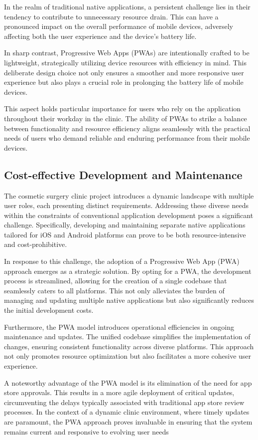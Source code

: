 \documentclass[conference]{IEEEtran}
\begin{document}
In the realm of traditional native applications, a persistent challenge lies in their tendency to contribute to unnecessary resource drain. This can have a pronounced impact on the overall performance of mobile devices, adversely affecting both the user experience and the device's battery life.

In sharp contrast, Progressive Web Apps (PWAs) are intentionally crafted to be lightweight, strategically utilizing device resources with efficiency in mind. This deliberate design choice not only ensures a smoother and more responsive user experience but also plays a crucial role in prolonging the battery life of mobile devices.

This aspect holds particular importance for users who rely on the application throughout their workday in the clinic. The ability of PWAs to strike a balance between functionality and resource efficiency aligns seamlessly with the practical needs of users who demand reliable and enduring performance from their mobile devices.

\subsection{Cost-effective Development and Maintenance}
The cosmetic surgery clinic project introduces a dynamic landscape with multiple user roles, each presenting distinct requirements. Addressing these diverse needs within the constraints of conventional application development poses a significant challenge. Specifically, developing and maintaining separate native applications tailored for iOS and Android platforms can prove to be both resource-intensive and cost-prohibitive.

In response to this challenge, the adoption of a Progressive Web App (PWA) approach emerges as a strategic solution. By opting for a PWA, the development process is streamlined, allowing for the creation of a single codebase that seamlessly caters to all platforms. This not only alleviates the burden of managing and updating multiple native applications but also significantly reduces the initial development costs.

Furthermore, the PWA model introduces operational efficiencies in ongoing maintenance and updates. The unified codebase simplifies the implementation of changes, ensuring consistent functionality across diverse platforms. This approach not only promotes resource optimization but also facilitates a more cohesive user experience.

A noteworthy advantage of the PWA model is its elimination of the need for app store approvals. This results in a more agile deployment of critical updates, circumventing the delays typically associated with traditional app store review processes. In the context of a dynamic clinic environment, where timely updates are paramount, the PWA approach proves invaluable in ensuring that the system remains current and responsive to evolving user needs
\end{document}

